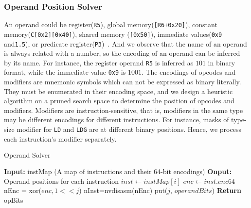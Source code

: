 \subsubsection{Operand Position Solver}
An operand could be register({\tt R5}), 
global memory({\tt [R6+0x20]}), constant memory({\tt C[0x2][0x40]}), shared memory ({\tt [0x50]}),
immediate values({\tt 0x9} and{\tt1.5}), or predicate register({\tt P3})~\cite{ptx2015isa}. %
And we observe that the name of an operand is always related with a number, so the encoding of an operand can be inferred by its name.
For instance, the register operand {\tt R5} is inferred as $101$ in binary format, while the immediate value {\tt 0x9} is $1001$. 
The encodings of opcodes and modifiers are mnemonic symbols which can not be expressed as binary literally. 
They must be enumerated in their encoding space, and we design a heuristic algorithm on a pruned search space to
determine the position of opcodes and modifiers.
Modifiers are instruction-sensitive, that is, modifiers in the same type may be different encodings for different instructions. 
For instance, masks of type-size
modifier for {\tt LD} and {\tt LDG} are at different binary positions. Hence, we process each instruction's modifier separately. 
\begin{algorithm}[htbp]
      \caption{Operand Solver}\label{algo:operand}
  \begin{algorithmic}[1]
      \State \textbf {Input:} instMap (A map of instructions and their 64-bit encodings)
      \State \textbf {Onput:} Operand positions for each instruction
      \State $inst \gets instMap[i]$
      \State $enc \gets inst.enc64$
      \State nEnc = xor($enc, 1<<j$)
      \State nInst=nvdisasm(nEnc)
      \State put($j$, $operandBits$)
      \EndIf
      \EndFor
      \EndFor
      \State \textbf{Return} opBits %
  \end{algorithmic}
\end{algorithm}
